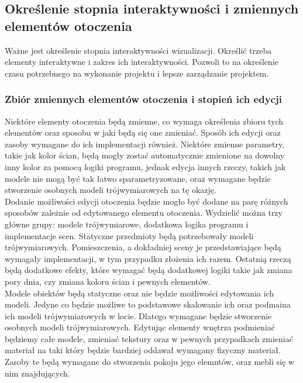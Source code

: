 \documentclass{article} %
\begin{document}
    \subsection{Określenie stopnia interaktywności i zmiennych elementów otoczenia}
        Ważne jest określenie stopnia interaktywności wizualizacji. Określić trzeba elementy interaktywne i zakres ich interaktywności. Pozwoli to na określenie czasu potrzebnego na wykonanie projektu i lepsze zarządzanie projektem. 
        \\
        
        \subsubsection{Zbiór zmiennych elementów otoczenia i stopień ich edycji}
        Niektóre elementy otoczenia będą zmienne, co wymaga określenia zbioru tych elementów oraz sposobu w jaki będą się one zmieniać. Sposób ich edycji oraz zasoby wymagane do ich implementacji również. Niektóre zmienne parametry, takie jak kolor ścian, będą mogły zostać automatycznie zmienione na dowolny inny kolor za pomocą logiki programu, jednak edycja innych rzeczy, takich jak modele nie mogą być tak łatwo sparametryzowane, oraz wymagane będzie stworzenie osobnych modeli trójwymiarowych na tę okazję.
        \\
        
        Dodanie możliwości edycji otoczenia będzie mogło być dodane na parę różnych sposobów zależnie od edytowanego elementu otoczenia. Wydzielić można trzy główne grupy: modele trójwymiarowe, dodatkowa logika programu i implementacje scen. Statyczne przedmioty będą potrzebowały modeli trójwymiarowych. Pomieszczenia, a dokładniej sceny je przedstawiające będą wymagały implementacji, w tym przypadku złożenia ich razem. Ostatnią rzeczą będą dodatkowe efekty, które wymagać będą dodatkowej logiki takie jak zmiana pory dnia, czy zmiana koloru ścian i pewnych elementów.
        \\
        
        Modele obiektów będą statyczne oraz nie będzie możliwości edytowania ich modeli. Jedyne co będzie możliwe to podstawowe skalowanie ich oraz podmaina ich modeli trójwymiarowych w locie. Dlatego wymagane będzie stworzenie osobnych modeli trójwymiarowych. Edytując elementy wnętrza podmieniać będziemy całe modele, zmieniać tekstury oraz w pewnych przypadkach zmieniać materiał na taki który będzie bardziej oddawał wymagany fizyczny materiał. Zasoby te będą wymagane do stworzenia pokoju jego elemntów, oraz mebli się w nim znajdujących.
        \\
        
\end{document}
